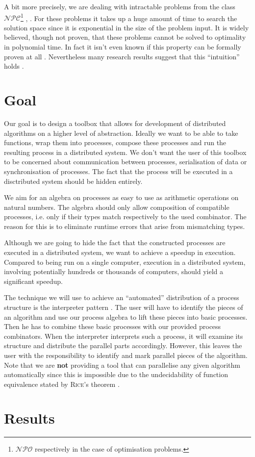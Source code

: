 A bit more precisely, we are dealing with intractable problems from the class $\mathcal{NPC}$\footnote{$\mathcal{NPO}$ respectively in the case of optimisation problems.} \cite{Garey:1979:CIG:578533}, \cite{Hopcroft:2006:IAT:1196416}. For these problems it takes up a huge amount of time to search the solution space since it is exponential in the size of the problem input. It is widely believed, though not proven, that these problems cannot be solved to optimality in polynomial time. In fact it isn't even known if this property can be formally proven at all \cite{}. Nevertheless many research results suggest that this \enquote{intuition} holds \cite{} \cite{} \cite{}.

\section{Goal}
\label{chp:goal}
Our goal is to design a toolbox that allows for development of distributed algorithms on a higher level of abstraction. Ideally we want to be able to take functions, wrap them into processes, compose these processes and run the resulting process in a distributed system. We don't want the user of this toolbox to be concerned about communication between processes, serialisation of data or synchronisation of processes. The fact that the process will be executed in a disctributed system should be hidden entirely.

We aim for an algebra on processes as easy to use as arithmetic operations on natural numbers. The algebra should only allow composition of compatible processes, i.e. only if their types match respectively to the used combinator. The reason for this is to eliminate runtime errors that arise from mismatching types.

Although we are going to hide the fact that the constructed processes are executed in a distributed system, we want to achieve a speedup in execution. Compared to being run on a single computer, execution in a distributed system, involving potentially hundreds or thousands of computers, should yield a significant speedup.

The technique we will use to achieve an \enquote{automated} distribution of a process structure is the interpreter pattern \cite{Gamma:1995:DPE:186897}. The user will have to identify the pieces of an algorithm and use our process algebra to lift these pieces into basic processes. Then he has to combine these basic processes with our provided process combinators. When the interpreter interprets such a process, it will examine its structure and distribute the parallel parts accordingly. However, this leaves the user with the responsibility to identify and mark parallel pieces of the algorithm. Note that we are \textbf{not} providing a tool that can parallelise any given algorithm automatically since this is impossible due to the undecidability of function equivalence stated by \textsc{Rice}'s theorem \cite{}.

\section{Results}
\lipsum[1-6]